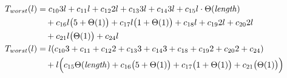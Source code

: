 \begin{subequations}
\label{eq:mergelines-j-2}
\begin{align}
\label{eq:mergelines-j-2-1}
T_{worst}(l)& =
c_{10}3l
+ c_{11}l
+ c_{12}2l
+ c_{13}3l
+ c_{14}3l
+ c_{15}l\cdot\Theta(\mathit{length})
\\
& \quad
+ c_{16}l\bigl(5 + \Theta(1)\bigr)
+ c_{17}l\bigl(1 + \Theta(1)\bigr)
+ c_{18}l
+ c_{19}2l
+ c_{20}2l
\nonumber \\
& \quad
+ c_{21}l\bigl(\Theta(1)\bigr)
+ c_{24}l
\nonumber \\
\label{eq:mergelines-j-2-2}
T_{worst}(l)& =
l(c_{10}3 + c_{11} + c_{12}2 + c_{13}3 + c_{14}3 + c_{18} + c_{19}2 + c_{20}2 + c_{24})
\\
& \quad
+ l\Bigl(c_{15}\Theta(\mathit{length}) + c_{16}\bigl(5 + \Theta(1)\bigr) + c_{17}\bigl(1 + \Theta(1)\bigr)
+ c_{21}\bigl(\Theta(1)\bigr)\Bigr)
\nonumber
\end{align}
\end{subequations}
